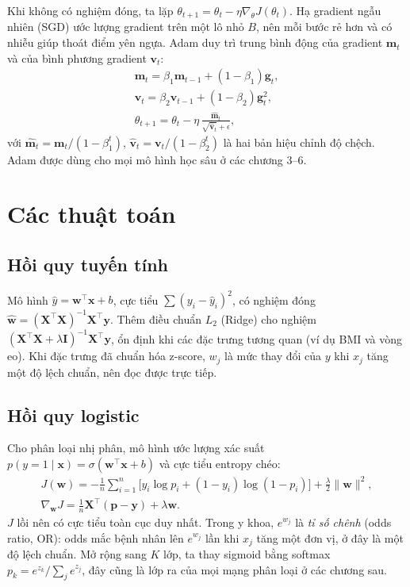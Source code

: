Khi  không có nghiệm đóng, ta lặp $\theta_{t+1} = \theta_t - \eta \nabla_\theta J(\theta_t)$. Hạ gradient ngẫu nhiên (SGD) ước lượng gradient trên một lô nhỏ $B$, nên mỗi bước rẻ hơn và có nhiễu giúp thoát điểm yên ngựa. Adam \cite{kingma2015} duy trì trung bình động của gradient $\mathbf m_t$ và của bình phương gradient $\mathbf v_t$:
\begin{equation}
\begin{gathered}
\mathbf m_t = \beta_1\mathbf m_{t-1} + (1-\beta_1)\mathbf g_t, \\
\mathbf v_t = \beta_2\mathbf v_{t-1} + (1-\beta_2)\mathbf g_t^2, \\
\theta_{t+1} = \theta_t - \eta\,\frac{\hat{\mathbf m}_t}{\sqrt{\hat{\mathbf v}_t}+\epsilon},
\end{gathered}
\label{eq:adam}
\end{equation}
với $\hat{\mathbf m}_t = \mathbf m_t/(1-\beta_1^t)$, $\hat{\mathbf v}_t = \mathbf v_t/(1-\beta_2^t)$ là hai bản hiệu chỉnh độ chệch. Adam được dùng cho mọi mô hình học sâu ở các chương 3–6.

\section{Các thuật toán}

\subsection{Hồi quy tuyến tính}

Mô hình $\hat y = \mathbf w^\top \mathbf x + b$, cực tiểu $\sum(y_i-\hat y_i)^2$, có nghiệm đóng $\hat{\mathbf w} = (\mathbf X^\top\mathbf X)^{-1}\mathbf X^\top\mathbf y$. Thêm điều chuẩn $L_2$ (Ridge) cho nghiệm $(\mathbf X^\top\mathbf X+\lambda\mathbf I)^{-1}\mathbf X^\top\mathbf y$, ổn định khi các đặc trưng tương quan (ví dụ BMI và vòng eo). Khi đặc trưng đã chuẩn hóa z-score, $w_j$ là mức thay đổi của $y$ khi $x_j$ tăng một độ lệch chuẩn, nên đọc được trực tiếp.

\subsection{Hồi quy logistic}

Cho phân loại nhị phân, mô hình ước lượng xác suất $p(y{=}1\mid\mathbf x)=\sigma(\mathbf w^\top\mathbf x+b)$ và cực tiểu entropy chéo:
\begin{equation}
\begin{gathered}
J(\mathbf w) = -\frac1n\sum_{i=1}^n\big[y_i\log p_i + (1-y_i)\log(1-p_i)\big] + \frac{\lambda}{2}\|\mathbf w\|^2, \\
\nabla_{\mathbf w}J = \frac1n \mathbf X^\top(\mathbf p-\mathbf y) + \lambda\mathbf w .
\end{gathered}
\label{eq:logreg}
\end{equation}
$J$ lồi nên có cực tiểu toàn cục duy nhất. Trong y khoa, $e^{w_j}$ là \emph{tỉ số chênh} (odds ratio, OR): odds mắc bệnh nhân lên $e^{w_j}$ lần khi $x_j$ tăng một đơn vị, ở đây là một độ lệch chuẩn. Mở rộng sang $K$ lớp, ta thay sigmoid bằng softmax $p_k = e^{z_k}/\sum_j e^{z_j}$, đây cũng là lớp ra của mọi mạng phân loại ở các chương sau.

